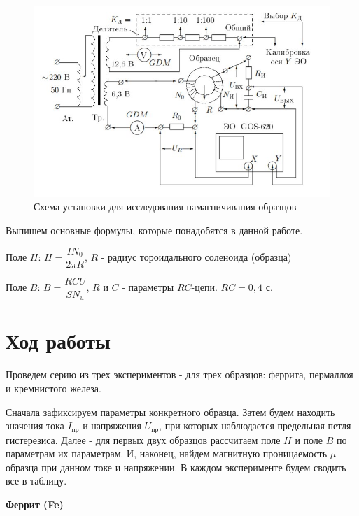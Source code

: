 \documentclass[a4paper,12pt]{article} %
\begin{document}
\begin{figure}[h!]
	\centering
	\includegraphics[width=\linewidth]{Pictures/Scheme.jpeg}
	\caption{Схема установки для исследования намагничивания образцов}
\end{figure}

\newpage
Выпишем основные формулы, которые понадобятся в данной работе.

Поле $H$:  $H = \dfrac{IN_0}{2\pi R}$,   $R$ - радиус тороидального соленоида (образца)

\vspace{7mm}
Поле $B$:  $B = \dfrac{RCU}{SN_u}$,      $R$ и $C$ - параметры $RC$-цепи. $RC = 0,4$ с.

\section*{Ход работы}

Проведем серию из трех экспериментов - для трех образцов: феррита, пермаллоя и кремнистого железа.

Сначала зафиксируем параметры конкретного образца. Затем будем находить значения тока $I_{\text{пр}}$ и напряжения $U_{\text{пр}}$, при которых наблюдается предельная петля гистерезиса. Далее - для первых двух образцов рассчитаем поле $H$ и поле $B$ по параметрам их параметрам. И, наконец, найдем магнитную проницаемость $\mu$ образца при данном токе и напряжении. В каждом эксперименте будем сводить все в таблицу.

\vspace{8mm}
\textbf{{\large Феррит (Fe)}}
\end{document}
